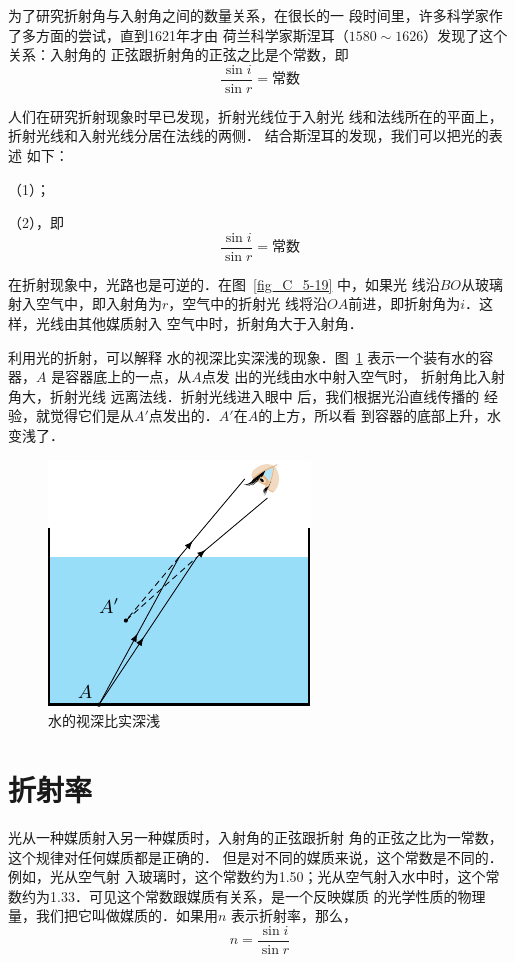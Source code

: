 为了研究折射角与入射角之间的数量关系，在很长的一
段时间里，许多科学家作了多方面的尝试，直到1621年才由
荷兰科学家斯涅耳（$1580 \sim 1626$）发现了这个关系：入射角的
正弦跟折射角的正弦之比是个常数，即
\[\frac{\sin i}{\sin r}=\text{常数}\]

人们在研究折射现象时早已发现，折射光线位于入射光
线和法线所在的平面上，折射光线和入射光线分居在法线的两侧．
结合斯涅耳的发现，我们可以把光的表述
如下：

（1）；

（2），即
\[\frac{\sin i}{\sin r}=\text{常数}\]


在折射现象中，光路也是可逆的．在图~\ref{fig_C_5-19} 中，如果光
线沿$BO$从玻璃射入空气中，即入射角为$r$，空气中的折射光
线将沿$OA$前进，即折射角为$i$．这样，光线由其他媒质射入
空气中时，折射角大于入射角．

利用光的折射，可以解释
水的视深比实深浅的现象．图~\ref{fig_C_5-20} 表示一个装有水的容器，$A$
是容器底上的一点，从$A$点发
出的光线由水中射入空气时，
折射角比入射角大，折射光线
远离法线．折射光线进入眼中
后，我们根据光沿直线传播的
经验，就觉得它们是从$A'$点发出的．$A'$在$A$的上方，所以看
到容器的底部上升，水变浅了．
\begin{figure}[htbp]
    \centering
    \includegraphics{fig/C/5-20.pdf}
    \caption{水的视深比实深浅}\label{fig_C_5-20}
\end{figure}

\section{折射率}\label{sec_C_5-6}
光从一种媒质射入另一种媒质时，入射角的正弦跟折射
角的正弦之比为一常数，这个规律对任何媒质都是正确的．
但是对不同的媒质来说，这个常数是不同的．例如，光从空气射
入玻璃时，这个常数约为1.50；光从空气射入水中时，这个常
数约为1.33．可见这个常数跟媒质有关系，是一个反映媒质
的光学性质的物理量，我们把它叫做媒质的．如果用$n$
表示折射率，那么，
\[n=\frac{\sin i}{\sin r}\]

